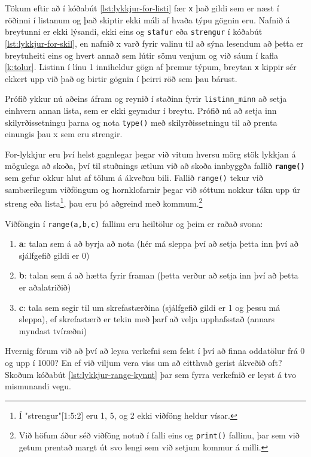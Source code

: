 \lstset{style=venjulegt}

Tökum eftir að í kóðabút \ref{lst:lykkjur-for-listi} fær \texttt{x} það gildi sem er næst í röðinni í listanum og það skiptir ekki máli af hvaða týpu gögnin eru.
Nafnið á breytunni er ekki lýsandi, ekki eins og \texttt{stafur} eða \texttt{strengur} í kóðabút \ref{lst:lykkjur-for-skil}, en nafnið x varð fyrir valinu til að sýna lesendum að þetta er breytuheiti eins og hvert annað sem lútir sömu venjum og við sáum í kafla \ref{k:tolur}.
Listinn í línu 1 inniheldur gögn af þremur týpum, breytan \texttt{x} kippir sér ekkert upp við það og birtir gögnin í þeirri röð sem þau bárust.

Prófið ykkur nú aðeins áfram og reynið í staðinn fyrir \texttt{listinn\_minn} að setja einhvern annan lista, sem er ekki geymdur í breytu.
Prófið nú að setja inn skilyrðissetningu þarna og nota \texttt{type()} með skilyrðissetningu til að prenta einungis þau x sem eru strengir.

For-lykkjur eru því helst gagnlegar þegar við vitum hversu mörg stök lykkjan á mögulega að skoða, því til stuðnings ætlum við að skoða innbyggða fallið \textbf{\texttt{range()}} sem gefur okkur hlut af tölum á ákveðnu bili.
Fallið \texttt{range()} tekur við sambærilegum viðföngum og hornklofarnir þegar við sóttum nokkur tákn upp úr streng eða lista\footnote{Í "strengur"[1:5:2] eru 1, 5, og 2 ekki viðföng heldur vísar.}, þau eru þó aðgreind með kommum.\footnote{Við höfum áður séð viðföng notuð í falli eins og \texttt{print()} fallinu, þar sem við getum prentað margt út svo lengi sem við setjum kommur á milli.}

Viðföngin í \texttt{range(a,b,c)} fallinu eru heiltölur og þeim er raðað svona:

\begin{enumerate}
	\item \textbf{a}: talan sem á að byrja að nota (hér má sleppa því að setja þetta inn því að sjálfgefið gildi er 0)
	\item \textbf{b}: talan sem á að hætta fyrir framan (þetta verður að setja inn því að þetta er aðalatriðið)
	\item \textbf{c}: tala sem segir til um skrefastærðina (sjálfgefið gildi er 1 og þessu má sleppa), ef skrefastærð er tekin með þarf að velja upphafsstað (annars myndast tvíræðni)
\end{enumerate}

Hvernig förum við að því að leysa verkefni sem felst í því að finna oddatölur frá 0 og upp í 1000?
En ef við viljum vera viss um að eitthvað gerist ákveðið oft?
Skoðum kóðabút \ref{lst:lykkjur-range-kynnt} þar sem fyrra verkefnið er leyst á tvo mismunandi vegu.

